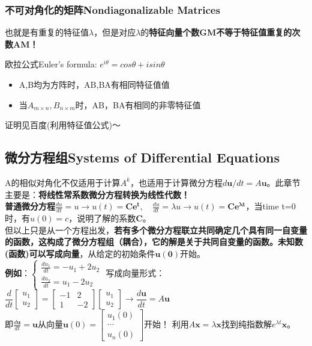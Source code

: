 \documentclass[UTF8]{article}
\begin{document}
    \subsubsection{不可对角化的矩阵Nondiagonalizable Matrices}
    也就是有重复的特征值$\lambda$，但是对应$\lambda$的\textbf{特征向量个数GM不等于特征值重复的次数AM！}

    欧拉公式Euler's formula: $e^{i\theta} = cos\theta + isin\theta$
    \begin{itemize}
        \item A,B均为方阵时，AB,BA有相同特征值值
        \item 当$A_{m\times n}, B_{n\times m}$时，AB，BA有相同的非零特征值
    \end{itemize}
    证明见百度(利用特征值公式)～

    \subsection{微分方程组Systems of Differential Equations}
    A的相似对角化不仅适用于计算$A^k$，也适用于计算微分方程$d\bm{u}/dt = A\bm{u}$。此章节主要是：\textbf{将线性常系数微分方程转换为线性代数！}
    \\
    \textbf{普通微分方程}$\frac{du}{dt} = u \rightarrow u(t)=\bm{Ce^t}, \quad \frac{du}{dt} = \lambda u \rightarrow u(t)=\bm{Ce^{\lambda t}}$，当time t=0时，有$u(0)=c$，说明了解的系数$\bm{C}$。
    \\
    但以上只是从一个方程出发，\textbf{若有多个微分方程联立共同确定几个具有同一自变量的函数，这构成了微分方程组（耦合），它的解是关于共同自变量的函数。未知数(函数)可以写成向量}，从给定的初始条件$\bm{u(0)}$开始。
    \\
    \textbf{例如}：$\left\{\begin{array}{l} \frac{du_1}{dt}=-u_1+2u_2 \\ \frac{du_2}{dt}=u_1-2u_2 \end{array}\right.$ 写成向量形式：$\dfrac{d}{dt} \begin{bmatrix}u_1 \\ u_2 \end{bmatrix}=\begin{bmatrix}-1 & 2 \\ 1 & -2 \end{bmatrix}\begin{bmatrix}u_1 \\ u_2 \end{bmatrix} \rightarrow \dfrac{d\bm{u}}{dt}=A\bm{u}$
    \\
    即$\frac{d\bm{u}}{dt}= \bm{u}$从向量$\bm{u}(0)=\begin{bmatrix} u_{1}(0) \\ \cdots \\ u_{n}(0) \end{bmatrix}$开始！
    利用$A \boldsymbol{x}=\lambda \boldsymbol{x}$找到纯指数解$e^{\lambda t} \bm{x}$。
\end{document}

